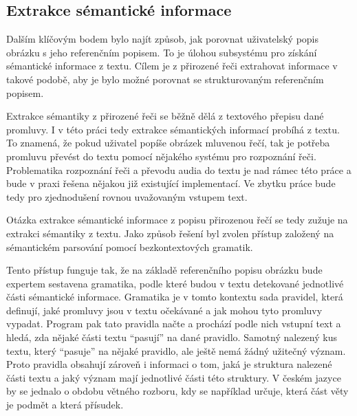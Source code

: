 \subsection{Extrakce sémantické informace}\label{subsec:extrakce_semanticke_informace}
Dalším klíčovým bodem bylo najít způsob, jak porovnat uživatelský popis obrázku s jeho referenčním popisem.
To je úlohou subsystému pro získání sémantické informace z textu.
Cílem je z přirozené řeči extrahovat informace v takové podobě, aby je bylo možné porovnat se strukturovaným referenčním popisem.


Extrakce sémantiky z přirozené řeči se běžně dělá z textového přepisu dané promluvy.
I v této práci tedy extrakce sémantických informací probíhá z textu.
To znamená, že pokud uživatel popíše obrázek mluvenou řečí, tak je potřeba promluvu převést do textu pomocí nějakého systému pro rozpoznání řeči.
Problematika rozpoznání řeči a převodu audia do textu je nad rámec této práce a bude v praxi řešena nějakou již existující implementací.
Ve zbytku práce bude tedy pro zjednodušení rovnou uvažovaným vstupem text.

Otázka extrakce sémantické informace z popisu přirozenou řečí se tedy zužuje na extrakci sémantiky z textu.
Jako způsob řešení byl zvolen přístup založený na sémantickém parsování pomocí bezkontextových gramatik.

Tento přístup funguje tak, že na základě referenčního popisu obrázku bude expertem sestavena gramatika,
podle které budou v textu detekované jednotlivé části sémantické informace.
Gramatika je v tomto kontextu sada pravidel, která definují, jaké promluvy jsou v textu očekávané a jak mohou tyto promluvy vypadat.
Program pak tato pravidla načte a prochází podle nich vstupní text a hledá, zda nějaké části textu \enquote{pasují} na dané pravidlo.
Samotný nalezený kus textu, který \enquote{pasuje} na nějaké pravidlo, ale ještě nemá žádný užitečný význam.
Proto pravidla obsahují zároveň i informaci o tom, jaká je struktura nalezené části textu a jaký význam mají jednotlivé části této struktury.
V českém jazyce by se jednalo o obdobu větného rozboru, kdy se například určuje, která část věty je podmět a která přísudek.

